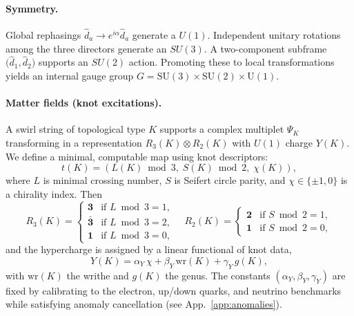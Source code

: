 \documentclass[10pt,reprint,aps,onecolumn,nofootinbib]{revtex4-2}
\begin{document}
    \paragraph{Symmetry.}
        Global rephasings $\hat{d}_a \!\to\! e^{i\alpha}\hat{d}_a$ generate a $U(1)$.
        Independent unitary rotations among the three directors generate an $SU(3)$.
        A two-component subframe $\big(\hat{d}_1,\hat{d}_2\big)$ supports an $SU(2)$ action.
        Promoting these to local transformations yields an internal gauge group
        $G=\mathrm{SU(3)}\times\mathrm{SU(2)}\times\mathrm{U(1)}$.

    \paragraph{Matter fields (knot excitations).}
        A swirl string of topological type $K$ supports a complex multiplet $\Psi_K$
        transforming in a representation $R_3(K)\otimes R_2(K)$ with $U(1)$ charge $Y(K)$.
        We define a minimal, computable map using knot descriptors:
        \[
            t(K)=(L(K)\bmod 3,\; S(K)\bmod 2,\; \chi(K)),
        \]
        where $L$ is minimal crossing number, $S$ is Seifert circle parity, and $\chi\!\in\!\{\pm 1,0\}$ is a chirality index.
        Then
        \[
            R_3(K)=
            \begin{cases}
            \mathbf{3} & \text{if } L\bmod 3=1,\\
            \bar{\mathbf{3}} & \text{if } L\bmod 3=2,\\
            \mathbf{1} & \text{if } L\bmod 3=0,
            \end{cases}\quad
            R_2(K)=
            \begin{cases}
            \mathbf{2} & \text{if } S\bmod 2=1,\\
            \mathbf{1} & \text{if } S\bmod 2=0,
            \end{cases}
        \]
        and the hypercharge is assigned by a linear functional of knot data,
        \[
            Y(K)=\alpha_Y\,\chi + \beta_Y\,\mathrm{wr}(K) + \gamma_Y\, g(K),
        \]
        with $\mathrm{wr}(K)$ the writhe and $g(K)$ the genus.
        The constants $(\alpha_Y,\beta_Y,\gamma_Y)$ are fixed by calibrating to the electron,
        up/down quarks, and neutrino benchmarks while satisfying anomaly cancellation
        (see App.~\ref{app:anomalies}).
\end{document}
